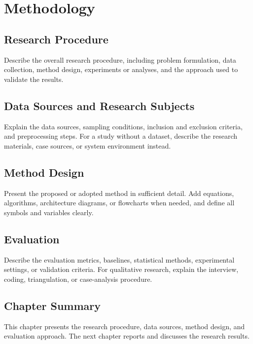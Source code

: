 \chapter{Methodology}

\section{Research Procedure}

Describe the overall research procedure, including problem formulation, data collection, method design, experiments or analyses, and the approach used to validate the results.

\section{Data Sources and Research Subjects}

Explain the data sources, sampling conditions, inclusion and exclusion criteria, and preprocessing steps. For a study without a dataset, describe the research materials, case sources, or system environment instead.

\section{Method Design}

Present the proposed or adopted method in sufficient detail. Add equations, algorithms, architecture diagrams, or flowcharts when needed, and define all symbols and variables clearly.

\section{Evaluation}

Describe the evaluation metrics, baselines, statistical methods, experimental settings, or validation criteria. For qualitative research, explain the interview, coding, triangulation, or case-analysis procedure.

\section{Chapter Summary}

This chapter presents the research procedure, data sources, method design, and evaluation approach. The next chapter reports and discusses the research results.
